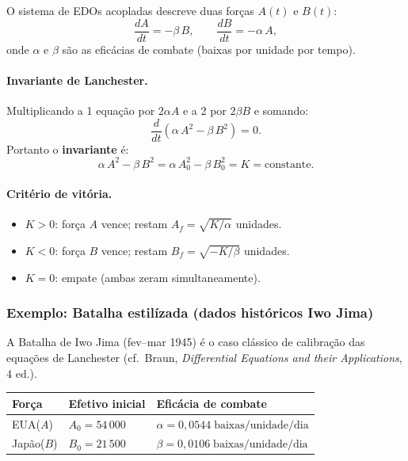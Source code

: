 \documentclass[12pt,a4paper]{article}
\theoremstyle{definition}
\newcommand{\resultado}[1]{%
  \begin{center}
    \fbox{\parbox{0.85\linewidth}{\centering $\displaystyle #1$}}
  \end{center}
}
\begin{document}
O sistema de EDOs acopladas descreve duas for\c{c}as $A(t)$ e $B(t)$:
\begin{equation}
  \frac{dA}{dt} = -\beta\,B, \qquad \frac{dB}{dt} = -\alpha\,A,
  \label{eq:lanchester}
\end{equation}
onde $\alpha$ e $\beta$ s\~ao as efic\'acias de combate (baixas por unidade por tempo).

\paragraph{Invariante de Lanchester.}
Multiplicando a 1\textordfeminine{} equa\c{c}\~ao por $2\alpha A$ e a 2\textordfeminine{}
por $2\beta B$ e somando:
\begin{equation}
  \frac{d}{dt}\!\left(\alpha\,A^2 - \beta\,B^2\right) = 0.
\end{equation}
Portanto o \textbf{invariante} \'e:
\begin{equation}
  \alpha\,A^2 - \beta\,B^2 = \alpha\,A_0^2 - \beta\,B_0^2 = K = \text{constante.}
  \label{eq:invariante}
\end{equation}

\paragraph{Crit\'erio de vit\'oria.}
\begin{itemize}
  \item $K > 0$: for\c{c}a $A$ vence; restam $A_f = \sqrt{K/\alpha}$ unidades.
  \item $K < 0$: for\c{c}a $B$ vence; restam $B_f = \sqrt{-K/\beta}$ unidades.
  \item $K = 0$: empate (ambas zeram simultaneamente).
\end{itemize}
\resultado{\alpha A_0^2 - \beta B_0^2 = K}

\subsubsection*{Exemplo: Batalha estil\'izada (dados hist\'oricos Iwo Jima)}

A Batalha de Iwo Jima (fev--mar 1945) \'e o caso cl\'assico de calibra\c{c}\~ao
das equa\c{c}\~oes de Lanchester (cf.\
Braun, \textit{Differential Equations and their Applications}, 4\textordfeminine{} ed.).

\begin{center}
\begin{tabular}{lll}
\toprule
For\c{c}a & Efetivo inicial & Efic\'acia de combate \\
\midrule
EUA\;($A$) & $A_0 = 54\,000$ & $\alpha = 0{,}0544\;\text{baixas/unidade/dia}$ \\
Jap\~ao\;($B$) & $B_0 = 21\,500$ & $\beta = 0{,}0106\;\text{baixas/unidade/dia}$ \\
\bottomrule
\end{tabular}
\end{center}
\end{document}
